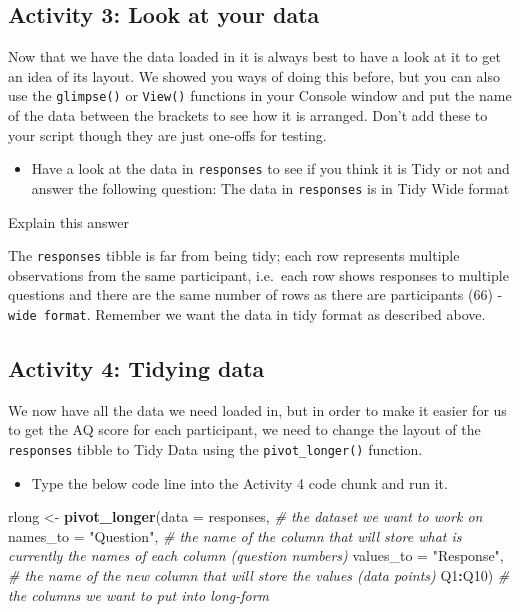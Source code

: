 \documentclass[]{book}
\newenvironment{Shaded}{\begin{snugshade}}{\end{snugshade}}
\newcommand{\CommentTok}[1]{\textcolor[rgb]{0.56,0.35,0.01}{\textit{#1}}}
\newcommand{\DataTypeTok}[1]{\textcolor[rgb]{0.13,0.29,0.53}{#1}}
\newcommand{\KeywordTok}[1]{\textcolor[rgb]{0.13,0.29,0.53}{\textbf{#1}}}
\newcommand{\NormalTok}[1]{#1}
\newcommand{\OperatorTok}[1]{\textcolor[rgb]{0.81,0.36,0.00}{\textbf{#1}}}
\newcommand{\StringTok}[1]{\textcolor[rgb]{0.31,0.60,0.02}{#1}}
\providecommand{\tightlist}{%
  \setlength{\itemsep}{0pt}\setlength{\parskip}{0pt}}
\begin{document}
\hypertarget{activity-3-look-at-your-data}{%
\subsection{Activity 3: Look at your data}\label{activity-3-look-at-your-data}}

Now that we have the data loaded in it is always best to have a look at it to get an idea of its layout. We showed you ways of doing this before, but you can also use the \texttt{glimpse()} or \texttt{View()} functions in your Console window and put the name of the data between the brackets to see how it is arranged. Don't add these to your script though they are just one-offs for testing.

\begin{itemize}
\tightlist
\item
  Have a look at the data in \texttt{responses} to see if you think it is Tidy or not and answer the following question: The data in \texttt{responses} is in Tidy Wide format
\end{itemize}

Explain this answer

The \texttt{responses} tibble is far from being tidy; each row represents multiple observations from the same participant, i.e.~each row shows responses to multiple questions and there are the same number of rows as there are participants (66) - \texttt{wide\ format}. Remember we want the data in tidy format as described above.

\hypertarget{gather}{%
\subsection{Activity 4: Tidying data}\label{gather}}

We now have all the data we need loaded in, but in order to make it easier for us to get the AQ score for each participant, we need to change the layout of the \texttt{responses} tibble to Tidy Data using the \texttt{pivot\_longer()} function.

\begin{itemize}
\tightlist
\item
  Type the below code line into the Activity 4 code chunk and run it.
\end{itemize}

\begin{Shaded}
\begin{Highlighting}[]
\NormalTok{rlong <-}\StringTok{ }\KeywordTok{pivot_longer}\NormalTok{(}\DataTypeTok{data =}\NormalTok{ responses, }\CommentTok{# the dataset we want to work on}
                \DataTypeTok{names_to =} \StringTok{"Question"}\NormalTok{, }\CommentTok{# the name of the column that will store what is currently the names of each column (question numbers)}
                \DataTypeTok{values_to =} \StringTok{"Response"}\NormalTok{, }\CommentTok{# the name of the new column that will store the values (data points)}
\NormalTok{                Q1}\OperatorTok{:}\NormalTok{Q10) }\CommentTok{# the columns we want to put into long-form}
\end{Highlighting}
\end{Shaded}
\end{document}
